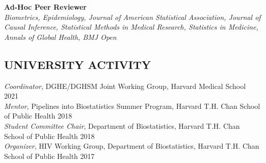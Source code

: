 \documentclass[12pt]{article}
\begin{document}
\textbf{Ad-Hoc Peer Reviewer} \\
\textit{Biometrics, Epidemiology, Journal of American Statistical Association, Journal of Causal Inference, Statistical Methods in Medical Research, Statistics in Medicine, Annals of Global Health, BMJ Open}

\subsection*{\textbf{UNIVERSITY ACTIVITY}}
\textit{Coordinator}, DGHE/DGHSM Joint Working Group, Harvard Medical School \hfill \hfill 2021 \\
\textit{Mentor}, Pipelines into Biostatistics Summer Program, Harvard T.H. Chan School of
Public Health \hfill \hfill 2018 \\
\textit{Student Committee Chair}, Department of Biostatistics, Harvard T.H. Chan School of
Public Health \hfill \hfill 2018 \\
\textit{Organizer}, HIV Working Group, Department of Biostatistics, Harvard T.H. Chan School of
Public Health \hfill \hfill 2017 
\end{document}
